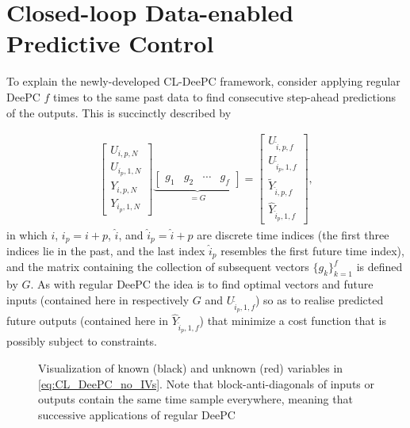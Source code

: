 \section{Closed-loop Data-enabled Predictive Control}
To explain the newly-developed \ac{CL-DeePC} framework, consider applying regular \ac{DeePC} $f$ times to the same past data to find consecutive step-ahead predictions of the outputs. This is succinctly described by

\begin{align}\label{eq:CL_DeePC_no_IVs}
\begin{bmatrix}
    U_{i,p,N}\\U_{i_p,1,N}\\Y_{i,p,N}\\ \hline Y_{i_p,1,N}
\end{bmatrix}
\underbrace{
\begin{bmatrix}
    g_1 & g_2 & \cdots & g_f
\end{bmatrix}}_{= G} =
\begin{bmatrix}
    U_{\hat{i},p,f}\\
    U_{\hat{i}_p,1,f}\\
    \widetilde{Y}_{\hat{i},p,f}\\
    \hline
    \widehat{Y}_{\hat{i}_p,1,f}
\end{bmatrix},
\end{align}
in which $i$, $i_p=i+p$, $\hat{i}$, and $\hat{i}_p=\hat{i}+p$ are discrete time indices (the first three indices lie in the past, and the last index $\hat{i}_p$ resembles the first future time index), and the matrix containing the collection of subsequent vectors $\{g_k\}^f_{k=1}$ is defined by $G$. As with regular \ac{DeePC} the idea is to find optimal vectors and future inputs (contained here in respectively $G$ and $U_{\hat{i}_p,1,f}$) so as to realise predicted future outputs (contained here in $\widehat{Y}_{\hat{i}_p,1,f}$) that minimize a cost function that is possibly subject to constraints.

\begin{figure}[b!]
\centering

\caption{Visualization of known (black) and unknown (red) variables in \eqref{eq:CL_DeePC_no_IVs}. %
Note that block-anti-diagonals of inputs or outputs contain the same time sample everywhere, meaning that successive applications of regular \ac{DeePC}}
\label{fig:CL-DeePC}
\end{figure}
